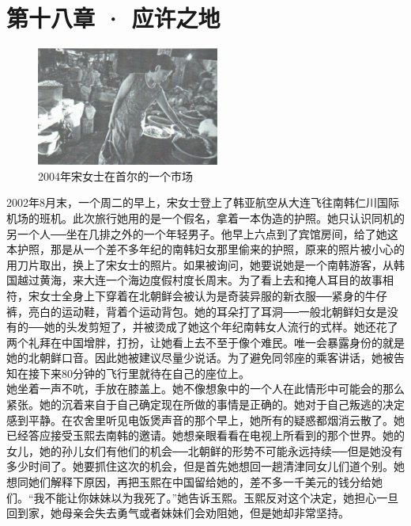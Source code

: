 \fancyhead[RO]{\thepage}
\fancyhead[LE]{\thepage}
\fancyfoot[LE,RO]{}
\fancyfoot[LO,CE]{}
\fancyfoot[CO,RE]{}
\chapter*{第十八章 · 应许之地}
\begin{figure}[!htbp]
\centering
\includegraphics[width=6cm]{./Chapters/Images/18.jpg}
\caption*{2004年宋女士在首尔的一个市场}
\end{figure}


2002年8月末，一个周二的早上，宋女士登上了韩亚航空从大连飞往南韩仁川国际机场的班机。此次旅行她用的是一个假名，拿着一本伪造的护照。她只认识同机的另一个人──坐在几排之外的一个年轻男子。他早上六点到了宾馆房间，给了她这本护照，那是从一个差不多年纪的南韩妇女那里偷来的护照，原来的照片被小心的用刀片取出，换上了宋女士的照片。如果被询问，她要说她是一个南韩游客，从韩国越过黄海，来大连一个海边度假村度长周末。为了看上去和掩人耳目的故事相符，宋女士全身上下穿着在北朝鲜会被认为是奇装异服的新衣服──紧身的牛仔裤，亮白的运动鞋，背着个运动背包。她的耳朵打了耳洞──一般北朝鲜妇女是没有的──她的头发剪短了，并被烫成了她这个年纪南韩女人流行的式样。她还花了两个礼拜在中国增胖，打扮，让她看上去不至于像个难民。唯一会暴露身份的就是她的北朝鲜口音。因此她被建议尽量少说话。为了避免同邻座的乘客讲话，她被告知在接下来80分钟的飞行里就待在自己的座位上。\\

她坐着一声不吭，手放在膝盖上。她不像想象中的一个人在此情形中可能会的那么紧张。她的沉着来自于自己确定现在所做的事情是正确的。她对于自己叛逃的决定感到平静。在农舍里听见电饭煲声音的那个早上，她所有的疑惑都烟消云散了。她已经答应接受玉熙去南韩的邀请。她想亲眼看看在电视上所看到的那个世界。她的女儿，她的孙儿女们有他们的机会──北朝鲜的形势不可能永远持续──但是她没有多少时间了。她要抓住这次的机会，但是首先她想回一趟清津同女儿们道个别。她想同她们解释下原因，再把玉熙在中国留给她的，差不多一千美元的钱分给她们。“我不能让你妹妹以为我死了。”她告诉玉熙。玉熙反对这个决定，她担心一旦回到家，她母亲会失去勇气或者妹妹们会劝阻她，但是她却非常坚持。\\

